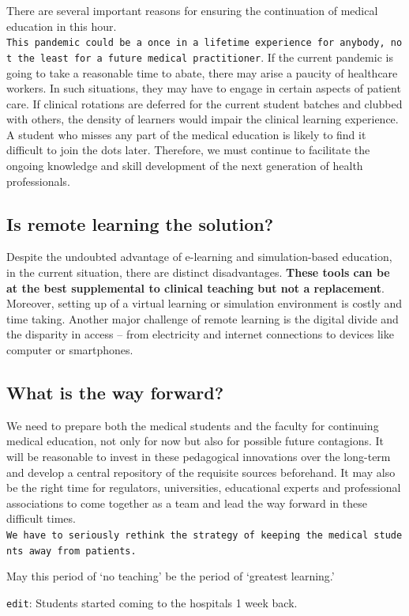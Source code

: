 \documentclass[
]{article}
\begin{document}
There are several important reasons for ensuring the continuation of
medical education in this hour.
\texttt{This\ pandemic\ could\ be\ a\ once\ in\ a\ lifetime\ experience\ for\ anybody,\ not\ the\ least\ for\ a\ future\ medical\ practitioner}.
If the current pandemic is going to take a reasonable time to abate,
there may arise a paucity of healthcare workers. In such situations,
they may have to engage in certain aspects of patient care. If clinical
rotations are deferred for the current student batches and clubbed with
others, the density of learners would impair the clinical learning
experience. A student who misses any part of the medical education is
likely to find it difficult to join the dots later. Therefore, we must
continue to facilitate the ongoing knowledge and skill development of
the next generation of health professionals.

\hypertarget{is-remote-learning-the-solution}{%
\subsection{Is remote learning the
solution?}\label{is-remote-learning-the-solution}}

Despite the undoubted advantage of e-learning and simulation-based
education, in the current situation, there are distinct disadvantages.
\textbf{These tools can be at the best supplemental to clinical teaching
but not a replacement}. Moreover, setting up of a virtual learning or
simulation environment is costly and time taking. Another major
challenge of remote learning is the digital divide and the disparity in
access -- from electricity and internet connections to devices like
computer or smartphones.

\hypertarget{what-is-the-way-forward}{%
\subsection{What is the way forward?}\label{what-is-the-way-forward}}

We need to prepare both the medical students and the faculty for
continuing medical education, not only for now but also for possible
future contagions. It will be reasonable to invest in these pedagogical
innovations over the long-term and develop a central repository of the
requisite sources beforehand. It may also be the right time for
regulators, universities, educational experts and professional
associations to come together as a team and lead the way forward in
these difficult times.
\texttt{We\ have\ to\ seriously\ rethink\ the\ strategy\ of\ keeping\ the\ medical\ students\ away\ from\ patients.}

May this period of `no teaching' be the period of `greatest learning.'

\texttt{edit}: Students started coming to the hospitals 1 week back.
\end{document}
